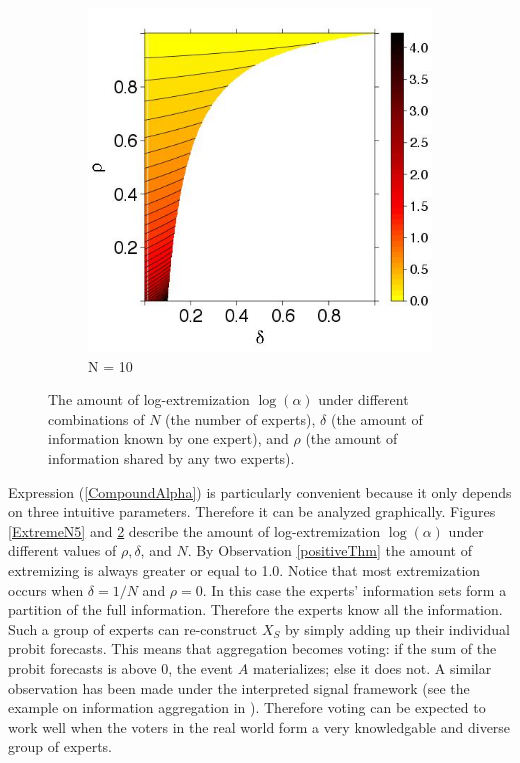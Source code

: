 \documentclass[11pt,twoside]{article}
\theoremstyle{definition}
\theoremstyle{definition}
\begin{document}
\begin{figure}
\begin{subfigure}[b]{0.45\textwidth}
                \includegraphics[width=\textwidth]{ExtremeN10.jpeg}
\caption{N = 10}
\label{ExtremeN30}
        \end{subfigure}
        \caption{ The amount of log-extremization $\log(\alpha)$ under different combinations of $N$ (the number of experts), $\delta$ (the amount of information known by one expert), and $\rho$ (the amount of information shared by any two experts).}
\end{figure}



Expression (\ref{CompoundAlpha}) is particularly convenient because it only depends on three intuitive parameters. Therefore it can be analyzed graphically. Figures \ref{ExtremeN5} and \ref{ExtremeN30} describe the amount of log-extremization $\log(\alpha)$ under different values of $\rho, \delta$, and $N$. By Observation \ref{positiveThm} the amount of extremizing is always greater or equal to 1.0. Notice that most extremization occurs when $\delta = 1/N$ and $\rho = 0$. In this case the experts' information sets form a partition of the full information. Therefore the experts know all the information. Such a group of experts can re-construct $X_S$ by simply adding up their individual probit forecasts. This means that aggregation becomes voting: if the sum of the probit forecasts is above 0, the event $A$ materializes; else it does not. A similar observation has been made under the interpreted signal framework (see the example on information aggregation in \cite{hong2009interpreted}). Therefore voting can be expected to work well when the voters in the real world form a very knowledgable and diverse group of experts. 
 
\end{document}
